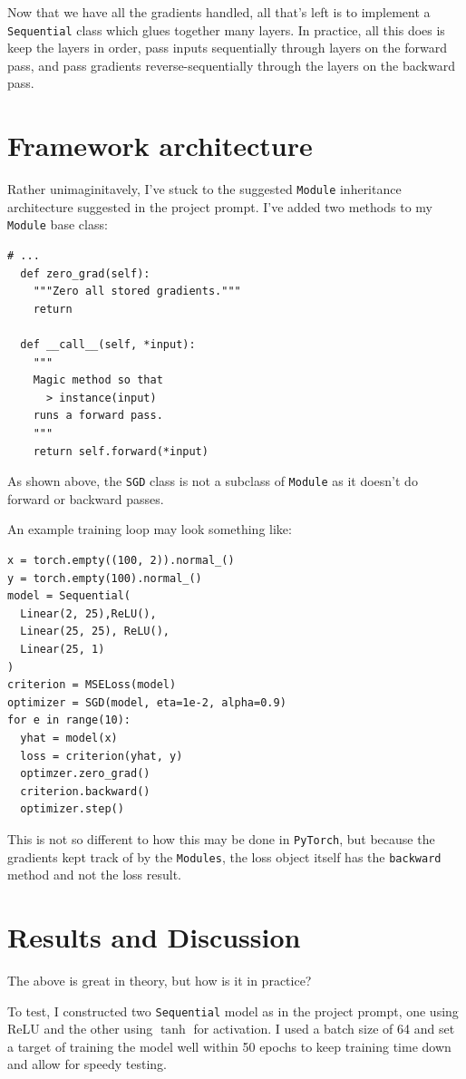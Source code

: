 \documentclass[prl, article, twocolumn]{revtex4-1}
\begin{document}
Now that we have all the gradients handled, all that's left is to implement a \texttt{Sequential} class which glues together many layers. In practice, all this does is keep the layers in order, pass inputs sequentially through layers on the forward pass, and pass gradients reverse-sequentially through the layers on the backward pass.

\section{Framework architecture}
Rather unimaginitavely, I've stuck to the suggested \texttt{Module} inheritance architecture suggested in the project prompt. I've added two methods to my \texttt{Module} base class:
\pagebreak
\begin{verbatim}
# ...
  def zero_grad(self):
    """Zero all stored gradients."""
    return

  def __call__(self, *input):
    """
    Magic method so that
      > instance(input)
    runs a forward pass.
    """
    return self.forward(*input)
\end{verbatim}

As shown above, the \texttt{SGD} class is not a subclass of \texttt{Module} as it doesn't do forward or backward passes.

An example training loop may look something like:
\begin{verbatim}
x = torch.empty((100, 2)).normal_()
y = torch.empty(100).normal_()
model = Sequential(
  Linear(2, 25),ReLU(),
  Linear(25, 25), ReLU(),
  Linear(25, 1)
)
criterion = MSELoss(model)
optimizer = SGD(model, eta=1e-2, alpha=0.9)
for e in range(10):
  yhat = model(x)
  loss = criterion(yhat, y)
  optimzer.zero_grad()
  criterion.backward()
  optimizer.step()
\end{verbatim}
This is not so different to how this may be done in \texttt{PyTorch}, but because the gradients kept track of by the \texttt{Modules}, the loss object itself has the \texttt{backward} method and not the loss result.

\section{Results and Discussion}
The above is great in theory, but how is it in practice?

To test, I constructed two \texttt{Sequential} model as in the project prompt, one using ReLU and the other using $\tanh$ for activation. I used a batch size of 64 and set a target of training the model well within 50 epochs to keep training time down and allow for speedy testing.
\end{document}
